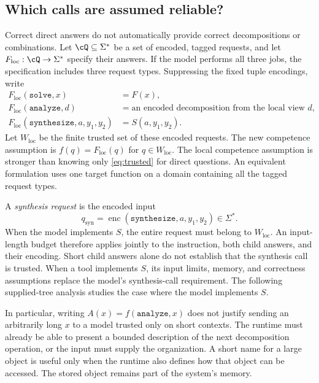 \documentclass[11pt,twoside]{article}
\newcommand{\enc}{\operatorname{enc}}
\theoremstyle{definition}
\theoremstyle{remark}
\begin{document}
\subsection{Which calls are assumed reliable?}

Correct direct answers do not automatically provide correct decompositions
or combinations. Let $\cQ\subseteq\Sigma^*$ be a set of encoded, tagged
requests, and let $F_{\mathrm{loc}}:\cQ\to\Sigma^*$ specify their answers.
If the model performs all three jobs, the specification includes three
request types. Suppressing the fixed tuple encodings, write
\begin{equation}
 \begin{aligned}
 F_{\mathrm{loc}}(\mathtt{solve},x)&=F(x),\\
 F_{\mathrm{loc}}(\mathtt{analyze},d)&=\text{an encoded decomposition from the local view }d,\\
 F_{\mathrm{loc}}(\mathtt{synthesize},a,y_1,y_2)&=S(a,y_1,y_2).
 \end{aligned}
 \label{eq:three-requests}
\end{equation}
Let $W_{\mathrm{loc}}$ be the finite trusted set of these encoded requests.
The new competence assumption is $f(q)=F_{\mathrm{loc}}(q)$ for $q\in W_{\mathrm{loc}}$.
The local competence assumption is stronger than knowing only
\eqref{eq:trusted} for direct questions.
An equivalent formulation uses one target function on a domain containing
all the tagged request types.

A \emph{synthesis request} is the encoded input
\[
 q_{\mathrm{syn}}=\enc(\mathtt{synthesize},a,y_1,y_2)\in\Sigma^*.
\]
When the model implements $S$, the entire request must belong to
$W_{\mathrm{loc}}$. An input-length budget therefore applies jointly to
the instruction, both child answers, and their encoding. Short child
answers alone do not establish that the synthesis call is trusted.
When a tool implements $S$, its input limits, memory, and correctness
assumptions replace the model's synthesis-call requirement. The following
supplied-tree analysis studies the case where the model implements $S$.

In particular, writing $A(x)=f(\mathtt{analyze},x)$ does not justify sending
an arbitrarily long $x$ to a model trusted only on short contexts. The
runtime must already be able to present a bounded description of the next
decomposition operation, or the input must supply the organization. A
short name for a large object is useful only when the runtime also defines
how that object can be accessed. The stored object remains part of the
system's memory.
\end{document}

